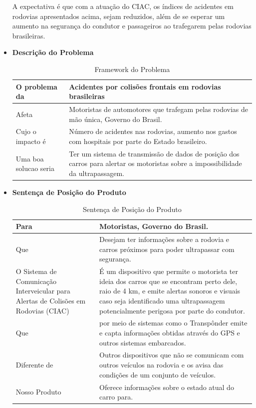 \begin{itemize}
A expectativa é que com a atuação do CIAC, os índices de acidentes em rodovias apresentados acima, sejam reduzidos, além de se esperar um aumento na segurança do condutor e passageiros ao trafegarem pelas rodovias brasileiras.

  \item  \textbf{Descrição do Problema}

\begin{table}[ht]
\caption{Framework do Problema}
\centering
\begin{tabular}{| l |  p{7cm} |}
\hline
O problema da & Acidentes por colisões frontais em rodovias brasileiras  \\
\hline
Afeta & Motoristas de automotores que trafegam pelas rodovias de mão única, Governo do Brasil. \\
\hline
Cujo o impacto é & Número de acidentes nas rodovias, aumento nos gastos com hospitais por parte do Estado brasileiro.\\
\hline
Uma boa solucao seria & Ter um sistema de transmissão de dados de posição dos carros para alertar os motoristas sobre a impossibilidade da ultrapassagem. \\
\hline
\end{tabular}
\end{table}


\item \textbf{Sentença de Posição do Produto}

\begin{table}[h!]
\caption{Sentença de Posição do Produto}
\centering
\begin{tabular}{| p{5cm} |  p{7cm} |}
\hline
Para & Motoristas, Governo do Brasil. \\
\hline
Que & Desejam ter informações sobre a rodovia e carros próximos para poder ultrapassar com segurança. \\
\hline
O Sistema de Comunicação Interveicular para Alertas de Colisões em Rodovias (CIAC) &É um dispositivo que permite o motorista ter ideia dos carros que se encontram perto dele, raio de 4 km, e emite alertas sonoros e visuais caso seja identificado uma ultrapassagem potencialmente perigosa por parte do condutor. \\
\hline
Que & por meio de sistemas como o Transpônder emite e capta informações obtidas através do GPS e outros sistemas embarcados. \\
\hline
Diferente de & Outros dispositivos que não se comunicam com outros veículos na rodovia e os avisa das condições de um conjunto de veículos.  \\
\hline
Nosso Produto & Oferece informações sobre o estado atual do carro para. \\
\hline
\end{tabular}
\end{table}



\end{itemize}
